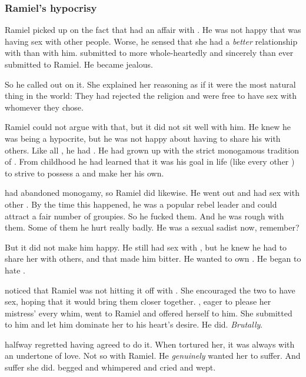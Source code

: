 \subsubsection{Ramiel's hypocrisy}
Ramiel picked up on the fact that \Shiaraid{} had an affair with \Eryal. 
He was not happy that \Shiaraid{} was having sex with other people.
Worse, he sensed that she had a \emph{better} relationship with \Eryal{} than with him. 
\Eryal{} submitted to \Shiaraid{} more whole-heartedly and sincerely than \Shiaraid{} ever submitted to Ramiel. 
He became jealous. 

So he called \Shiaraid{} out on it. 
She explained her reasoning as if it were the most natural thing in the world: 
They had rejected the \Merkyran{} religion and were free to have sex with whomever they chose. 

Ramiel could not argue with that, but it did not sit well with him. 
He knew he was being a hypocrite, but he was not happy about having to share his \resvil{} with others. 
Like all \resphain, he had . 
He had grown up with the strict monogamous tradition of \Merkyrah. 
From childhood he had learned that it was his goal in life (like every other \resphan) to strive to possess a \resvil{} and make her his own. 

\Shiaraid{} had abandoned monogamy, so Ramiel did likewise. 
He went out and had sex with other \resviel. 
By the time this happened, he was a popular rebel leader and could attract a fair number of groupies. 
So he fucked them. 
And he was rough with them. 
Some of them he hurt really badly. 
He was a sexual sadist now, remember? 

But it did not make him happy. 
He still had sex with \Shiaraid, but he knew he had to share her with others, and that made him bitter. 
He wanted to own \Shiaraid. 
He began to hate \Eryal. 

\Shiaraid{} noticed that Ramiel was not hitting it off with \Eryal. 
She encouraged the two to have sex, hoping that it would bring them closer together. 
\Eryal, eager to please her mistress' every whim, went to Ramiel and offered herself to him. 
She submitted to him and let him dominate her to his heart's desire. 
He did. 
\emph{Brutally}.

\Eryal{} halfway regretted having agreed to do it. 
When \Shiaraid{} tortured her, it was always with an undertone of love. 
Not so with Ramiel. 
He \emph{genuinely} wanted her to suffer. 
And suffer she did. 
\Eryal{} begged and whimpered and cried and wept. 

